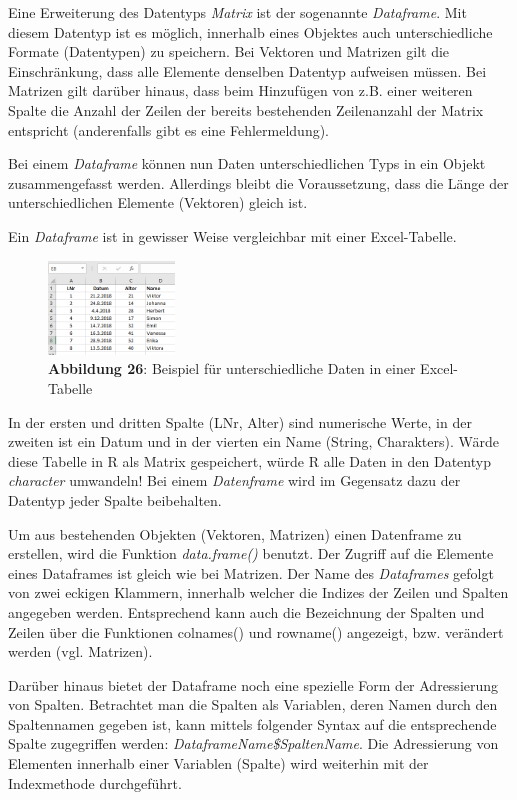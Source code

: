 \documentclass[]{article}
\begin{document}
Eine Erweiterung des Datentyps \emph{Matrix} ist der sogenannte
\emph{Dataframe}. Mit diesem Datentyp ist es möglich, innerhalb eines
Objektes auch unterschiedliche Formate (Datentypen) zu speichern. Bei
Vektoren und Matrizen gilt die Einschränkung, dass alle Elemente
denselben Datentyp aufweisen müssen. Bei Matrizen gilt darüber hinaus,
dass beim Hinzufügen von z.B. einer weiteren Spalte die Anzahl der
Zeilen der bereits bestehenden Zeilenanzahl der Matrix entspricht
(anderenfalls gibt es eine Fehlermeldung).

Bei einem \emph{Dataframe} können nun Daten unterschiedlichen Typs in
ein Objekt zusammengefasst werden. Allerdings bleibt die Voraussetzung,
dass die Länge der unterschiedlichen Elemente (Vektoren) gleich ist.

Ein \emph{Dataframe} ist in gewisser Weise vergleichbar mit einer
Excel-Tabelle.

\begin{figure}
\centering
\includegraphics[width=0.30000\textwidth]{Images/ExcelTabelle.PNG}
\caption{\textbf{Abbildung 26}: Beispiel für unterschiedliche Daten in
einer Excel-Tabelle}
\end{figure}

In der ersten und dritten Spalte (LNr, Alter) sind numerische Werte, in
der zweiten ist ein Datum und in der vierten ein Name (String,
Charakters). Wärde diese Tabelle in R als Matrix gespeichert, würde R
alle Daten in den Datentyp \emph{character} umwandeln! Bei einem
\emph{Datenframe} wird im Gegensatz dazu der Datentyp jeder Spalte
beibehalten.

Um aus bestehenden Objekten (Vektoren, Matrizen) einen Datenframe zu
erstellen, wird die Funktion \emph{data.frame()} benutzt. Der Zugriff
auf die Elemente eines Dataframes ist gleich wie bei Matrizen. Der Name
des \emph{Dataframes} gefolgt von zwei eckigen Klammern, innerhalb
welcher die Indizes der Zeilen und Spalten angegeben werden.
Entsprechend kann auch die Bezeichnung der Spalten und Zeilen über die
Funktionen colnames() und rowname() angezeigt, bzw. verändert werden
(vgl. Matrizen).

Darüber hinaus bietet der Dataframe noch eine spezielle Form der
Adressierung von Spalten. Betrachtet man die Spalten als Variablen,
deren Namen durch den Spaltennamen gegeben ist, kann mittels folgender
Syntax auf die entsprechende Spalte zugegriffen werden:
\emph{DataframeName\$SpaltenName}. Die Adressierung von Elementen
innerhalb einer Variablen (Spalte) wird weiterhin mit der Indexmethode
durchgeführt.
\end{document}
